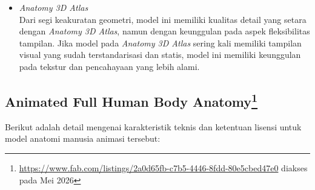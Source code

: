 \begin{enumerate}
\begin{itemize}
                   \item \textit{Anatomy 3D Atlas}\\ Dari segi keakuratan geometri, model ini memiliki kualitas detail yang setara dengan \textit{Anatomy 3D Atlas}, namun dengan keunggulan pada aspek fleksibilitas tampilan. Jika model pada \textit{Anatomy 3D Atlas} sering kali memiliki tampilan visual yang sudah terstandarisasi dan statis, model ini memiliki keunggulan pada tekstur dan pencahayaan yang lebih alami.
                \end{itemize}
            \end{enumerate}

        \subsection[Animated Full Human Body Anatomy]{Animated Full Human Body Anatomy\footnote{\url{https://www.fab.com/listings/2a0d65fb-c7b5-4446-8fdd-80e5cbed47e0} diakses pada Mei 2026}}
        Berikut adalah detail mengenai karakteristik teknis dan ketentuan lisensi untuk model anatomi manusia animasi tersebut:

